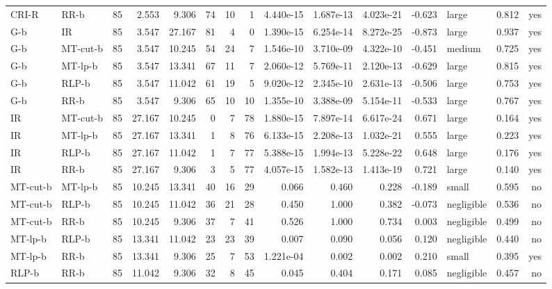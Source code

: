 \begin{table}[htbp]
\begin{tabular}{llrrrrrrrrrrlrr}
CRI-R & RR-b & 85 & 2.553 & 9.306 & 74 & 10 & 1 & 4.440e-15 & 1.687e-13 & 4.023e-21 & -0.623 & large & 0.812 & yes \\
G-b & IR & 85 & 3.547 & 27.167 & 81 & 4 & 0 & 1.390e-15 & 6.254e-14 & 8.272e-25 & -0.873 & large & 0.937 & yes \\
G-b & MT-cut-b & 85 & 3.547 & 10.245 & 54 & 24 & 7 & 1.546e-10 & 3.710e-09 & 4.322e-10 & -0.451 & medium & 0.725 & yes \\
G-b & MT-lp-b & 85 & 3.547 & 13.341 & 67 & 11 & 7 & 2.060e-12 & 5.769e-11 & 2.120e-13 & -0.629 & large & 0.815 & yes \\
G-b & RLP-b & 85 & 3.547 & 11.042 & 61 & 19 & 5 & 9.020e-12 & 2.345e-10 & 2.631e-13 & -0.506 & large & 0.753 & yes \\
G-b & RR-b & 85 & 3.547 & 9.306 & 65 & 10 & 10 & 1.355e-10 & 3.388e-09 & 5.154e-11 & -0.533 & large & 0.767 & yes \\
IR & MT-cut-b & 85 & 27.167 & 10.245 & 0 & 7 & 78 & 1.880e-15 & 7.897e-14 & 6.617e-24 & 0.671 & large & 0.164 & yes \\
IR & MT-lp-b & 85 & 27.167 & 13.341 & 1 & 8 & 76 & 6.133e-15 & 2.208e-13 & 1.032e-21 & 0.555 & large & 0.223 & yes \\
IR & RLP-b & 85 & 27.167 & 11.042 & 1 & 7 & 77 & 5.388e-15 & 1.994e-13 & 5.228e-22 & 0.648 & large & 0.176 & yes \\
IR & RR-b & 85 & 27.167 & 9.306 & 3 & 5 & 77 & 4.057e-15 & 1.582e-13 & 1.413e-19 & 0.721 & large & 0.140 & yes \\
MT-cut-b & MT-lp-b & 85 & 10.245 & 13.341 & 40 & 16 & 29 & 0.066 & 0.460 & 0.228 & -0.189 & small & 0.595 & no \\
MT-cut-b & RLP-b & 85 & 10.245 & 11.042 & 36 & 21 & 28 & 0.450 & 1.000 & 0.382 & -0.073 & negligible & 0.536 & no \\
MT-cut-b & RR-b & 85 & 10.245 & 9.306 & 37 & 7 & 41 & 0.526 & 1.000 & 0.734 & 0.003 & negligible & 0.499 & no \\
MT-lp-b & RLP-b & 85 & 13.341 & 11.042 & 23 & 23 & 39 & 0.007 & 0.090 & 0.056 & 0.120 & negligible & 0.440 & no \\
MT-lp-b & RR-b & 85 & 13.341 & 9.306 & 25 & 7 & 53 & 1.221e-04 & 0.002 & 0.002 & 0.210 & small & 0.395 & yes \\
RLP-b & RR-b & 85 & 11.042 & 9.306 & 32 & 8 & 45 & 0.045 & 0.404 & 0.171 & 0.085 & negligible & 0.457 & no \\
\bottomrule
\end{tabular}
\end{table}

